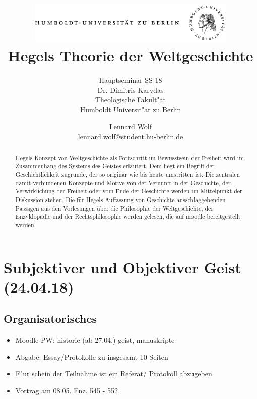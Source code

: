 \documentclass[emulatestandardclasses]{scrartcl}
\date{\vspace{-3ex}}
\begin{document}
\title{
	\includegraphics*[width=0.75\textwidth]{ErstesSem/images/hu_logo.png}\\
	\vspace{24pt}
	Hegels Theorie der Weltgeschichte}
\subtitle{Hauptseminar SS 18\\
          Dr. Dimitris Karydas\\
          Theologische Fakult"at \\ 
          Humboldt Universit"at zu Berlin}
\author{Lennard Wolf\\
        \small{\href{mailto:lennard.wolf@student.hu-berlin.de}{lennard.wolf@student.hu-berlin.de}}}
\maketitle
\begin{abstract}

Hegels Konzept von Weltgeschichte als Fortschritt im Bewusstsein der Freiheit wird im Zusammenhang des Systems des Geistes erläutert. Dem liegt ein Begriff der Geschichtlichkeit zugrunde, der so originär wie bis heute umstritten ist. Die zentralen damit verbundenen Konzepte und Motive von der Vernunft in der Geschichte, der Verwirklichung der Freiheit oder vom Ende der Geschichte werden im Mittelpunkt der Diskussion stehen. Die für Hegels Auffassung von Geschichte ausschlaggebenden Passagen aus den Vorlesungen über die Philosophie der Weltgeschichte, der Enzyklopädie und der Rechtsphilosophie werden gelesen, die auf moodle bereitgestellt werden.
\end{abstract}
\newpage

\tableofcontents
\listoffigures
\newpage


\section{Subjektiver und Objektiver Geist\\(24.04.18)}

\subsection{Organisatorisches}

\begin{itemize}
  \item Moodle-PW: historie (ab 27.04.) geist, manuskripte 
  \item Abgabe: Essay/Protokolle zu insgesamt 10 Seiten
  \item F"ur schein der Teilnahme ist ein Referat/ Protokoll abzugeben
  \item Vortrag am 08.05. Enz. 545 - 552
\end{itemize}
\end{document}
